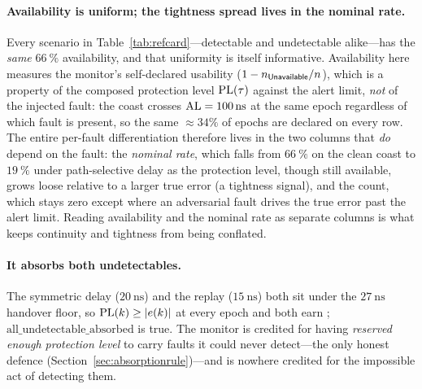 \paragraph{Availability is uniform; the tightness spread lives in the nominal rate.}
Every scenario in Table~\ref{tab:refcard}---detectable and undetectable alike---has
the \emph{same} $\SI{66}{\percent}$ availability, and that uniformity is itself
informative. Availability here measures the monitor's self-declared usability
($1-n_{\textsf{Unavailable}{}}/n$), which is a property of the composed protection level
$\mathrm{PL}(\tau)$ against the alert limit, \emph{not} of the injected fault: the coast
crosses $\mathrm{AL}=\SI{100}{\nano\second}$ at the same epoch regardless of which fault is
present, so the same $\approx\!34\%$ of epochs are declared \Unavail{} on every
row. The entire per-fault differentiation therefore lives in the two columns that
\emph{do} depend on the fault: the \emph{nominal rate}, which falls from
$\SI{66}{\percent}$ on the clean coast to $\SI{19}{\percent}$ under path-selective
delay as the protection level, though still available, grows loose relative to a
larger true error (a tightness signal), and the \HMI{} count, which stays zero
except where an adversarial fault drives the true error past the alert limit. Reading
availability and the nominal rate as separate columns is what keeps continuity and
tightness from being conflated.

\paragraph{It absorbs both undetectables.} The symmetric delay
($\SI{20}{\nano\second}$) and the replay ($\SI{15}{\nano\second}$) both sit under
the $\SI{27}{\nano\second}$ handover floor, so $\mathrm{PL}(k)\ge|e(k)|$ at every epoch and
both earn \Absorbed{}; $\mathrm{all\_undetectable\_absorbed}$ is true. The monitor
is credited for having \emph{reserved enough protection level} to carry faults it
could never detect---the only honest defence (Section~\ref{sec:absorptionrule})---and
is nowhere credited for the impossible act of detecting them.

